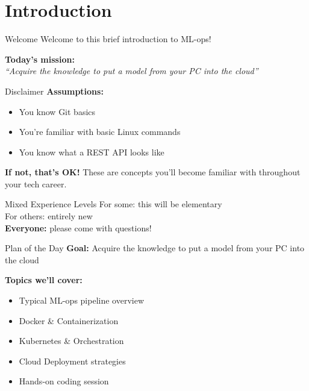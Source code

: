\documentclass[../main.tex]{subfiles}
\begin{document}
\section{Introduction}

\begin{frame}{Welcome}
    Welcome to this brief introduction to ML-ops!

    \bigskip

    \textbf{Today's mission:} \\
    \textit{``Acquire the knowledge to put a model from your PC into the cloud''}
\end{frame}

\begin{frame}{Disclaimer}
    \textbf{Assumptions:}
    \begin{itemize}
        \item You know Git basics
        \item You're familiar with basic Linux commands
        \item You know what a REST API looks like
    \end{itemize}

    \bigskip

    \textbf{If not, that's OK!} These are concepts you'll become familiar with throughout your tech career.

    \bigskip

    \begin{alertblock}{Mixed Experience Levels}
        For some: this will be elementary \\
        For others: entirely new \\
        \textbf{Everyone:} please come with questions!
    \end{alertblock}
\end{frame}

\begin{frame}{Plan of the Day}
    \textbf{Goal:} Acquire the knowledge to put a model from your PC into the cloud

    \bigskip

    \textbf{Topics we'll cover:}
    \begin{itemize}
        \item Typical ML-ops pipeline overview
        \item Docker \& Containerization
        \item Kubernetes \& Orchestration
        \item Cloud Deployment strategies
        \item Hands-on coding session
    \end{itemize}
\end{frame}
\end{document}
